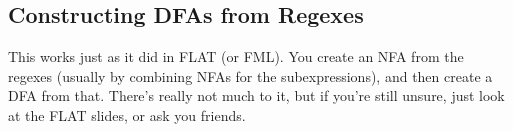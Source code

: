 \documentclass{article}
\begin{document}
\subsection{Constructing DFAs from Regexes}
This works just as it did in FLAT (or FML).
You create an NFA from the regexes (usually by combining NFAs for the subexpressions), and then create a DFA from that.
There's really not much to it, but if you're still unsure, just look at the FLAT slides, or ask you friends.
\end{document}
